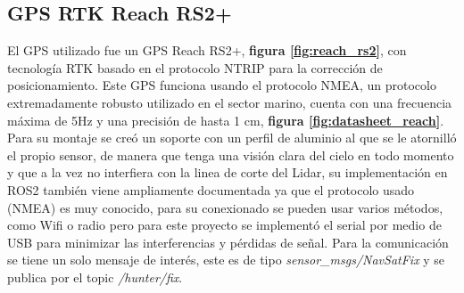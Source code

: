 \subsection{GPS RTK Reach RS2+}

El GPS utilizado fue un GPS Reach RS2+, \textbf{figura \ref{fig:reach_rs2}}, con tecnología RTK basado en el protocolo NTRIP para la 
corrección de posicionamiento. Este GPS funciona usando el protocolo NMEA, un protocolo extremadamente robusto utilizado en el sector marino, 
cuenta con una frecuencia máxima de 5Hz y una precisión de hasta 1 cm, \textbf{figura \ref{fig:datasheet_reach}}. Para su montaje se creó un soporte con un perfil de aluminio al que 
se le atornilló el propio sensor, de manera que tenga una visión clara del cielo en todo momento y que a la vez no interfiera con la linea de 
corte del Lidar, su implementación en ROS2 también viene ampliamente documentada ya que el protocolo usado (NMEA) es muy conocido, 
para su conexionado se pueden usar varios métodos, como Wifi o radio pero para este proyecto se implementó el serial por medio de USB para 
minimizar las interferencias y pérdidas de señal. Para la comunicación se tiene un solo mensaje de interés, este es de tipo \textit{sensor\_msgs/NavSatFix} 
y se publica por el topic \textit{/hunter/fix}.


